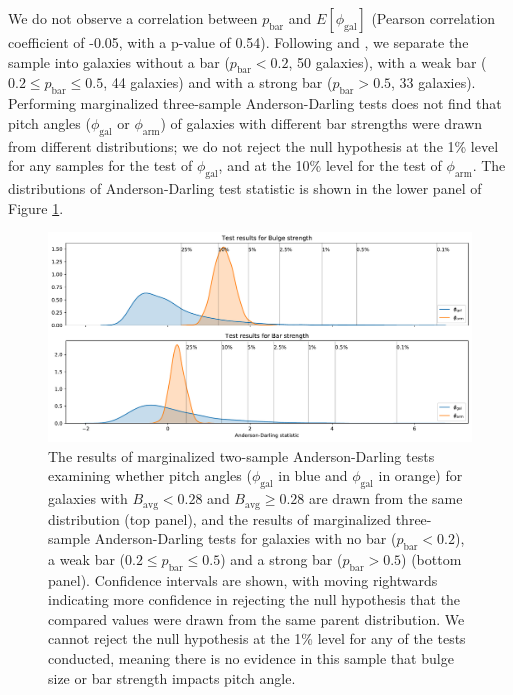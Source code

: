 We do not observe a correlation between $p_\mathrm{bar}$ and $E[\phi_\mathrm{gal}]$ (Pearson correlation coefficient of -0.05, with a p-value of 0.54). Following \citet{2012MNRAS.424.2180M} and \citet{2012MNRAS.423.1485S}, we separate the sample into galaxies without a bar ($p_\mathrm{bar} < 0.2$, 50 galaxies), with a weak bar ($0.2 \le p_\mathrm{bar} \le 0.5$, 44 galaxies) and with a strong bar ($p_\mathrm{bar} > 0.5$, 33 galaxies). Performing marginalized three-sample Anderson-Darling tests does not find that pitch angles ($\phi_\mathrm{gal}$ or $\phi_\mathrm{arm}$) of galaxies with different bar strengths were drawn from different distributions; we do not reject the null hypothesis at the 1\% level for any samples for the test of $\phi_\mathrm{gal}$, and at the 10\% level for the test of $\phi_\mathrm{arm}$. The distributions of Anderson-Darling test statistic is shown in the lower panel of Figure \ref{fig:ad-morphology-test}.

\begin{figure}
  \includegraphics[width=17.7cm]{plots/bulge_bar_test_results.pdf}
  \caption{The results of marginalized two-sample Anderson-Darling tests examining whether pitch angles ($\phi_\mathrm{gal}$ in blue and $\phi_\mathrm{gal}$ in orange) for galaxies with $B_\mathrm{avg} < 0.28$ and $B_\mathrm{avg} \ge 0.28$ are drawn from the same distribution (top panel), and the results of marginalized three-sample Anderson-Darling tests for galaxies with no bar ($p_\mathrm{bar} < 0.2$), a weak bar ($0.2 \le p_\mathrm{bar} \le 0.5$) and a strong bar ($p_\mathrm{bar} > 0.5$) (bottom panel). Confidence intervals are shown, with moving rightwards indicating more confidence in rejecting the null hypothesis that the compared values were drawn from the same parent distribution. We cannot reject the null hypothesis at the 1\% level for any of the tests conducted, meaning there is no evidence in this sample that bulge size or bar strength impacts pitch angle.}
  \label{fig:ad-morphology-test}
\end{figure}

